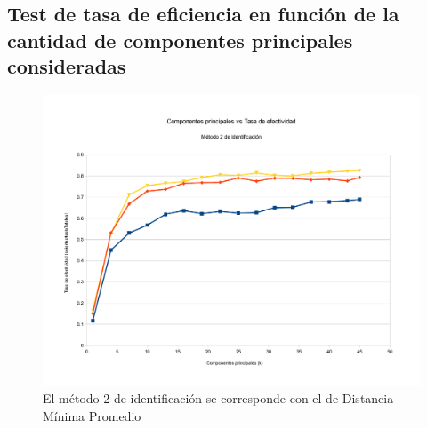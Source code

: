 \subsection{Test de tasa de eficiencia en función de la cantidad de componentes principales consideradas}
\begin{figure}[H]{}
\centering
\includegraphics[scale=0.5]{graphs/componentesPrincipalesVsTasaDeEfectividadM2.pdf}
\caption{El método 2 de identificación se corresponde con el de Distancia Mínima Promedio}
\label{CPvsTE}
\end{figure}